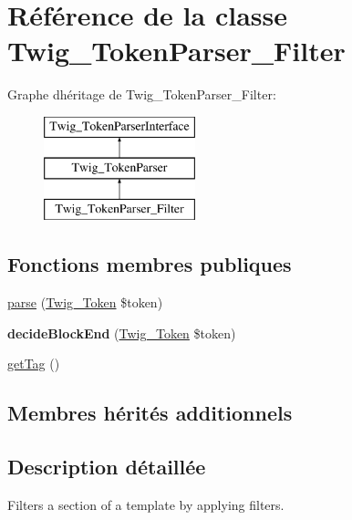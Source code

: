 \hypertarget{class_twig___token_parser___filter}{}\section{Référence de la classe Twig\+\_\+\+Token\+Parser\+\_\+\+Filter}
\label{class_twig___token_parser___filter}
Graphe d\textquotesingle{}héritage de Twig\+\_\+\+Token\+Parser\+\_\+\+Filter\+:\begin{figure}[H]
\begin{center}
\leavevmode
\includegraphics[height=3.000000cm]{class_twig___token_parser___filter}
\end{center}
\end{figure}
\subsection*{Fonctions membres publiques}
\begin{DoxyCompactItemize}
\item 
\hyperlink{class_twig___token_parser___filter_a5dfa2e269321584fb74e8b43dabe0efd}{parse} (\hyperlink{class_twig___token}{Twig\+\_\+\+Token} \$token)
\item 
{\bfseries decide\+Block\+End} (\hyperlink{class_twig___token}{Twig\+\_\+\+Token} \$token)\hypertarget{class_twig___token_parser___filter_aa976dc013d35c2813752149bacd88902}{}\label{class_twig___token_parser___filter_aa976dc013d35c2813752149bacd88902}

\item 
\hyperlink{class_twig___token_parser___filter_ab86ba36154b20e6bbfa3ba705f12f9d6}{get\+Tag} ()
\end{DoxyCompactItemize}
\subsection*{Membres hérités additionnels}


\subsection{Description détaillée}
Filters a section of a template by applying filters.


